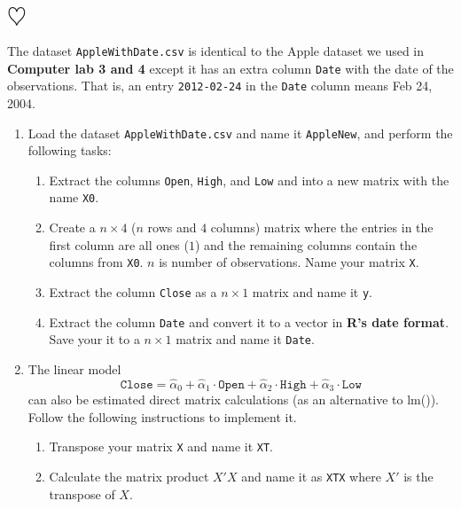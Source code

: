 \documentclass[a4paper]{article}
\begin{document}
\section{$\heartsuit$}
The dataset \texttt{AppleWithDate.csv} is identical to the Apple dataset we
used in \textbf{Computer lab 3 and 4} except it has an extra column
\texttt{Date} with the date of the observations. That is, an entry \texttt{2012-02-24} in the \texttt{Date} column
means Feb 24, 2004.

\begin{enumerate}
\item Load the dataset \texttt{AppleWithDate.csv} and name it \texttt{AppleNew}, and perform the following tasks:
  
  \begin{enumerate}
  \item Extract the columns \texttt{Open}, \texttt{High}, and
    \texttt{Low} and into a new matrix with the name \texttt{X0}.

  \item Create a $n\times 4$ ($n$ rows and $4$ columns) matrix where the entries in the first column are
    all ones ($1$) and the remaining columns contain the columns from \texttt{X0}. $n$ is
    number of observations. Name your matrix \texttt{X}.

  \item Extract the column \texttt{Close} as a $n\times 1$ matrix and name it \texttt{y}.

  \item Extract the column \texttt{Date} and convert it to a vector in \textbf{R's date format}. Save
    your it to a $n\times 1$ matrix and name it \texttt{Date}.

  \end{enumerate}


\item The linear model 
  \begin{equation*}
    \mathtt{Close} = \hat \alpha_0 + \hat \alpha_1 \cdot \mathtt{Open} + \hat
    \alpha_2 \cdot \mathtt{High}+
    \hat \alpha_3\cdot \mathtt{Low}
  \end{equation*}
  can also be estimated direct matrix calculations (as an alternative to lm()). Follow the following
  instructions to implement it. 

  \begin{enumerate}
  \item Transpose your matrix \texttt{X} and name it \texttt{XT}.

  \item Calculate the matrix product $X'X$ and name it as \texttt{XTX} where $X'$ is the transpose
    of $X$.


\end{enumerate}
\end{enumerate}
\end{document}

